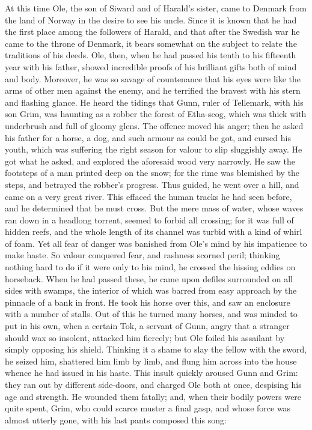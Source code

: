 \documentclass[10pt,a4paper]{report}
\begin{document}
At this time Ole, the son of Siward and of Harald's sister, came to Denmark from the land of Norway in the desire to see his uncle. Since it is known that he had the first place among the followers of Harald, and that after the Swedish war he came to the throne of Denmark, it bears somewhat on the subject to relate the traditions of his deeds. Ole, then, when he had passed his tenth to his fifteenth year with his father, showed incredible proofs of his brilliant gifts both of mind and body. Moreover, he was so savage of countenance that his eyes were like the arms of other men against the enemy, and he terrified the bravest with his stern and flashing glance. He heard the tidings that Gunn, ruler of Tellemark, with his son Grim, was haunting as a robber the forest of Etha-scog, which was thick with underbrush and full of gloomy glens. The offence moved his anger; then he asked his father for a horse, a dog, and such armour as could be got, and cursed his youth, which was suffering the right season for valour to slip sluggishly away. He got what he asked, and explored the aforesaid wood very narrowly. He saw the footsteps of a man printed deep on the snow; for the rime was blemished by the steps, and betrayed the robber's progress. Thus guided, he went over a hill, and came on a very great river. This effaced the human tracks he had seen before, and he determined that he must cross. But the mere mass of water, whose waves ran down in a headlong torrent, seemed to forbid all crossing; for it was full of hidden reefs, and the whole length of its channel was turbid with a kind of whirl of foam. Yet all fear of danger was banished from Ole's mind by his impatience to make haste. So valour conquered fear, and rashness scorned peril; thinking nothing hard to do if it were only to his mind, he crossed the hissing eddies on horseback. When he had passed these, he came upon defiles surrounded on all sides with swamps, the interior of which was barred from easy approach by the pinnacle of a bank in front. He took his horse over this, and saw an enclosure with a number of stalls. Out of this he turned many horses, and was minded to put in his own, when a certain Tok, a servant of Gunn, angry that a stranger should wax so insolent, attacked him fiercely; but Ole foiled his assailant by simply opposing his shield. Thinking it a shame to slay the fellow with the sword, he seized him, shattered him limb by limb, and flung him across into the house whence he had issued in his haste. This insult quickly aroused Gunn and Grim: they ran out by different side-doors, and charged Ole both at once, despising his age and strength. He wounded them fatally; and, when their bodily powers were quite spent, Grim, who could scarce muster a final gasp, and whose force was almost utterly gone, with his last pants composed this song:\\
\end{document}
